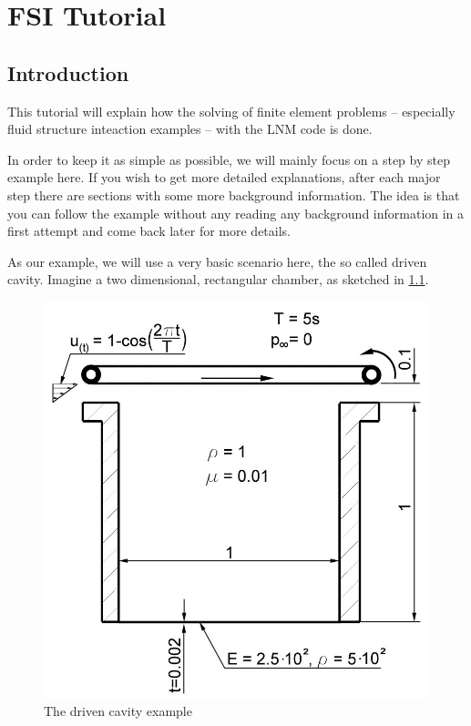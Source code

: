 \chapter{FSI Tutorial}
\label{tut_fsi:chap}

\section{Introduction}

This tutorial will explain how the solving of finite element problems
-- especially fluid structure inteaction examples -- with the LNM
code is done.

In order to keep it as simple as possible, we will mainly focus on
a step by step example here. If you wish to get more detailed explanations,
after each major step there are sections with some more background
information. The idea is that you can follow the example without any
reading any background information in a first attempt and come back
later for more details.

As our example, we will use a very basic scenario here, the so called
driven cavity. Imagine a two dimensional, rectangular chamber, as
sketched in \ref{tut_fsi:1.1}.

%
\begin{figure}[h]
\hfil\includegraphics[scale=0.2]{Bilder/Angabeskizze}


\caption{\label{tut_fsi:1.1} The driven cavity example}
\end{figure}


